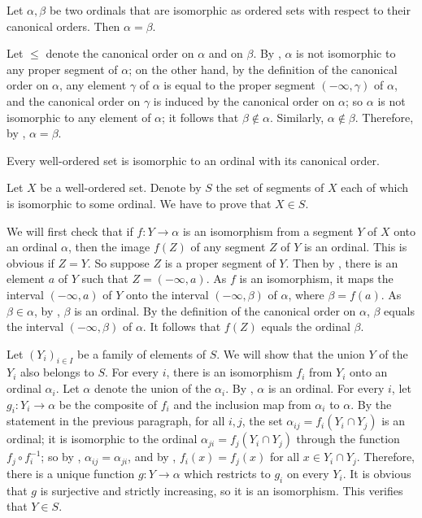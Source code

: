 \documentclass{article}
\begin{document}
\begin{theorem}
  \label{thm:9v9g7x0t}
  Let \(\alpha, \beta\) be two ordinals that are isomorphic as ordered
  sets with respect to their canonical orders.  Then
  \(\alpha = \beta\).
\end{theorem}

Let \(\leq\) denote the canonical order on \(\alpha\) and on
\(\beta\).  By , \(\alpha\) is not isomorphic to
any proper segment of \(\alpha\); on the other hand, by the definition
of the canonical order on \(\alpha\), any element \(\gamma\) of
\(\alpha\) is equal to the proper segment \((-\infty, \gamma)\) of
\(\alpha\), and the canonical order on \(\gamma\) is induced by the
canonical order on \(\alpha\); so \(\alpha\) is not isomorphic to any
element of \(\alpha\); it follows that \(\beta \notin \alpha\).
Similarly, \(\alpha \notin \beta\).  Therefore, by
, \(\alpha = \beta\).

\begin{theorem}
  \label{thm:15ehsi36}
  Every well-ordered set is isomorphic to an ordinal with its
  canonical order.
\end{theorem}

Let \(X\) be a well-ordered set.  Denote by \(S\) the set of segments
of \(X\) each of which is isomorphic to some ordinal.  We have to
prove that \(X \in S\).

We will first check that if \(f : Y \to \alpha\) is an isomorphism
from a segment \(Y\) of \(X\) onto an ordinal \(\alpha\), then the
image \(f(Z)\) of any segment \(Z\) of \(Y\) is an ordinal.  This is
obvious if \(Z = Y\).  So suppose \(Z\) is a proper segment of \(Y\).
Then by , there is an element \(a\) of \(Y\) such
that \(Z = (-\infty, a)\).  As \(f\) is an isomorphism, it maps the
interval \((-\infty, a)\) of \(Y\) onto the interval
\((-\infty, \beta)\) of \(\alpha\), where \(\beta = f(a)\).  As
\(\beta \in \alpha\), by , \(\beta\) is an ordinal.
By the definition of the canonical order on \(\alpha\), \(\beta\)
equals the interval \((-\infty, \beta)\) of \(\alpha\).  It follows
that \(f(Z)\) equals the ordinal \(\beta\).

Let \((Y_i)_{i \in I}\) be a family of elements of \(S\).  We will
show that the union \(Y\) of the \(Y_i\) also belongs to \(S\).  For
every \(i\), there is an isomorphism \(f_i\) from \(Y_i\) onto an
ordinal \(\alpha_i\).  Let \(\alpha\) denote the union of the
\(\alpha_i\).  By , \(\alpha\) is an ordinal.  For
every \(i\), let \(g_i : Y_i \to \alpha\) be the composite of \(f_i\)
and the inclusion map from \(\alpha_i\) to \(\alpha\).  By the
statement in the previous paragraph, for all \(i, j\), the set
\(\alpha_{ij} = f_i(Y_i \cap Y_j)\) is an ordinal; it is isomorphic to
the ordinal \(\alpha_{ji} = f_j(Y_i \cap Y_j)\) through the function
\(f_j\circ f_i^{-1}\); so by ,
\(\alpha_{ij} = \alpha_{ji}\), and by ,
\(f_i(x) = f_j(x)\) for all \(x \in Y_i \cap Y_j\).  Therefore, there
is a unique function \(g : Y \to \alpha\) which restricts to \(g_i\)
on every \(Y_i\).  It is obvious that \(g\) is surjective and strictly
increasing, so it is an isomorphism.  This verifies that \(Y \in S\).
\end{document}

